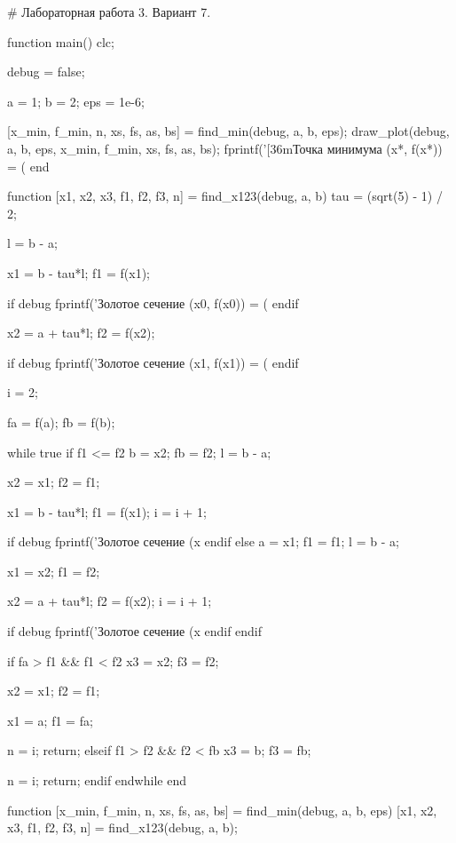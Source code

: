 # Лабораторная работа 3. Вариант 7.

function main()
  clc;

  debug = false;

  a = 1;
  b = 2;
  eps = 1e-6;

  [x_min, f_min, n, xs, fs, as, bs] = find_min(debug, a, b, eps);
  draw_plot(debug, a, b, eps, x_min, f_min, xs, fs, as, bs);
  fprintf('\n{}[36mТочка минимума (x*, f(x*)) = (%
end

function [x1, x2, x3, f1, f2, f3, n] = find_x123(debug, a, b)
  tau = (sqrt(5) - 1) / 2;

  l = b - a;

  x1 = b - tau*l;
  f1 = f(x1);

  if debug
    fprintf('Золотое сечение (x0, f(x0)) = (%
  endif

  x2 = a + tau*l;
  f2 = f(x2);

  if debug
    fprintf('Золотое сечение (x1, f(x1)) = (%
  endif

  i = 2;

  fa = f(a);
  fb = f(b);

  while true
    if f1 <= f2
      b = x2;
      fb = f2;
      l = b - a;

      x2 = x1;
      f2 = f1;

      x1 = b - tau*l;
      f1 = f(x1);
      i = i + 1;

      if debug
        fprintf('Золотое сечение (x%
      endif
    else
      a = x1;
      f1 = f1;
      l = b - a;

      x1 = x2;
      f1 = f2;

      x2 = a + tau*l;
      f2 = f(x2);
      i = i + 1;

      if debug
        fprintf('Золотое сечение (x%
      endif
    endif

    if fa > f1 && f1 < f2
      x3 = x2;
      f3 = f2;

      x2 = x1;
      f2 = f1;

      x1 = a;
      f1 = fa;

      n = i;
      return;
    elseif f1 > f2 && f2 < fb
      x3 = b;
      f3 = fb;

      n = i;
      return;
    endif
  endwhile
end

function [x_min, f_min, n, xs, fs, as, bs] = find_min(debug, a, b, eps)
  [x1, x2, x3, f1, f2, f3, n] = find_x123(debug, a, b);

